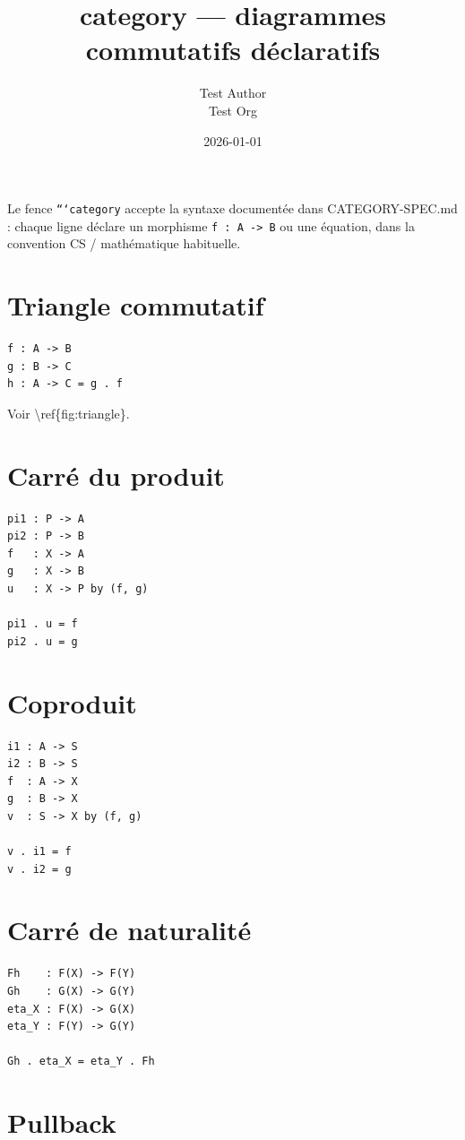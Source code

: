 \documentclass[11pt,a4paper]{article}
\title{category — diagrammes commutatifs déclaratifs}
\author{Test Author \\ Test Org}
\date{2026-01-01}
\theoremstyle{definition}
\begin{document}
\maketitle

Le fence \texttt{```category} accepte la syntaxe documentée dans CATEGORY-SPEC.md :
chaque ligne déclare un morphisme \texttt{f : A -> B} ou une équation, dans
la convention CS / mathématique habituelle.


\section{Triangle commutatif}

\begin{lstlisting}
f : A -> B
g : B -> C
h : A -> C = g . f
\end{lstlisting}


Voir \textbackslash{}ref\{fig:triangle\}.


\section{Carré du produit}

\begin{lstlisting}
pi1 : P -> A
pi2 : P -> B
f   : X -> A
g   : X -> B
u   : X -> P by (f, g)

pi1 . u = f
pi2 . u = g
\end{lstlisting}


\section{Coproduit}

\begin{lstlisting}
i1 : A -> S
i2 : B -> S
f  : A -> X
g  : B -> X
v  : S -> X by (f, g)

v . i1 = f
v . i2 = g
\end{lstlisting}


\section{Carré de naturalité}

\begin{lstlisting}
Fh    : F(X) -> F(Y)
Gh    : G(X) -> G(Y)
eta_X : F(X) -> G(X)
eta_Y : F(Y) -> G(Y)

Gh . eta_X = eta_Y . Fh
\end{lstlisting}


\section{Pullback}
\end{document}
